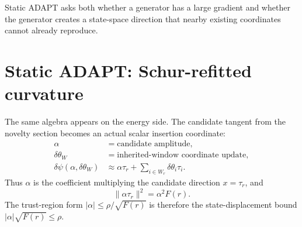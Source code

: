 \documentclass[10pt,twocolumn]{article}
\begin{document}
\begin{intuitionbox}
Static ADAPT asks both whether a generator has a large gradient and whether the generator creates a state-space direction that nearby existing coordinates cannot already reproduce.
\end{intuitionbox}

\section{Static ADAPT: Schur-refitted curvature}

The same algebra appears on the energy side. The candidate tangent from the novelty section becomes an actual scalar insertion coordinate:
\begin{equation}
\begin{aligned}
\alpha&=\text{candidate amplitude},\\
\delta\theta_W&=\text{inherited-window coordinate update},\\
\delta\psi(\alpha,\delta\theta_W)
&\approx \alpha\tau_r+\sum_{i\in W_r}\delta\theta_i\tau_i.
\end{aligned}
\label{eq:alpha_tangent_bridge}
\end{equation}
Thus \(\alpha\) is the coefficient multiplying the candidate direction \(x=\tau_r\), and
\begin{equation}
\|\alpha\tau_r\|^2=\alpha^2F(r).
\label{eq:alpha_F_bridge}
\end{equation}
The trust-region form \(|\alpha|\le\rho/\sqrt{F(r)}\) is therefore the state-displacement bound \(|\alpha|\sqrt{F(r)}\le\rho\).
\end{document}
